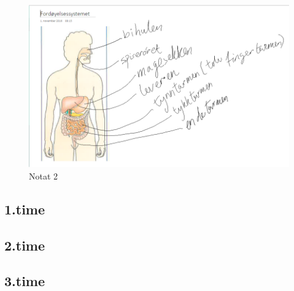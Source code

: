 \documentclass[main.tex]{subfiles}
\begin{document}
\begin{figure}[h!]
\includegraphics[scale = 0.6]{../figures/onenote_fordoyelse.png}
\caption{Notat 2}
\end{figure}

\subsection{1.time}

\subsection{2.time}

\subsection{3.time}
\end{document}
